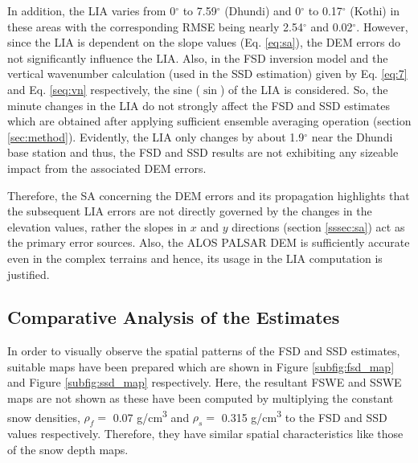 \documentclass[review]{elsarticle}
\numberwithin{equation}{section}
\numberwithin{figure}{section}
\numberwithin{table}{section}
\begin{document}
In addition, the LIA varies from 0$^\circ$ to 7.59$^\circ$ (Dhundi) and 0$^\circ$ to 0.17$^\circ$ (Kothi) in these areas with the corresponding RMSE being nearly 2.54$^\circ$ and 0.02$^\circ$. However, since the LIA is dependent on the slope values (Eq. \eqref{eq:sa}), the DEM errors do not significantly influence the LIA. Also, in the FSD inversion model and the vertical wavenumber calculation (used in the SSD estimation) given by Eq. \eqref{eq:7} and Eq. \eqref{seq:vn} respectively, the sine ($\sin$) of the LIA is considered. So, the minute changes in the LIA do not strongly affect the FSD and SSD estimates which are obtained after applying sufficient ensemble averaging operation (section \ref{sec:method}). Evidently, the LIA only changes by about 1.9$^\circ$ near the Dhundi base station and thus, the FSD and SSD results are not exhibiting any sizeable impact from the associated DEM errors.

Therefore, the SA concerning the DEM errors and its propagation highlights that the subsequent LIA errors are not directly governed by the changes in the elevation values, rather the slopes in $x$ and $y$ directions (section \ref{sssec:sa}) act as the primary error sources. Also, the ALOS PALSAR DEM is sufficiently accurate even in the complex terrains and hence, its usage in the LIA computation is justified.

\subsection{Comparative Analysis of the Estimates}
\label{ssec:snow}

In order to visually observe the spatial patterns of the FSD and SSD estimates, suitable maps have been prepared which are shown in Figure \ref{subfig:fsd_map} and Figure \ref{subfig:ssd_map} respectively. Here, the resultant FSWE and SSWE maps are not shown as these have been computed by multiplying the constant snow densities, $\rho_f = $ 0.07 g/cm\textsuperscript{3} and $\rho_s = $ 0.315 g/cm\textsuperscript{3} to the FSD and SSD values respectively. Therefore, they have similar spatial characteristics like those of the snow depth maps.
\end{document}
